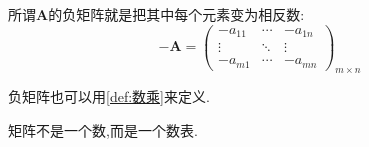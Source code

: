 \begin{formal}
\begin{definition}[负矩阵]\label{def:负矩阵}
    所谓$\displaystyle \bm{A}$的负矩阵就是把其中每个元素变为相反数:
\[  
    \bm{-A} = \begin{pmatrix}
        -a_{11}  & \cdots & -a_{1n} \\
        \vdots & \ddots  & \vdots \\
        -a_{m1}  & \cdots & -a_{mn}
    \end{pmatrix}_{m \times n}
\]
\end{definition}
\end{formal}
\vfill
\begin{red}
\begin{remark}
    负矩阵也可以用\cref{def:数乘}来定义.
\end{remark}
\end{red}
\begin{red}
    \begin{remark}
        矩阵不是一个数,而是一个数表.
    \end{remark}
\end{red}

